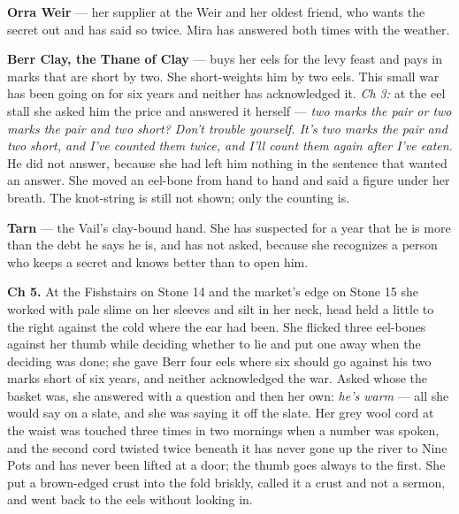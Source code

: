 \documentclass{design/chronicle}
\begin{document}
{\textbf{Orra Weir} — her supplier at the Weir and her oldest friend, who wants the secret out and has said so twice. Mira has answered both times with the weather.

\textbf{Berr Clay, the Thane of Clay} — buys her eels for the levy feast and pays in marks that are short by two. She short-weights him by two eels. This small war has been going on for six years and neither has acknowledged it. \emph{Ch 3:} at the eel stall she asked him the price and answered it herself --- \emph{two marks the pair or two marks the pair and two short? Don’t trouble yourself. It’s two marks the pair and two short, and I’ve counted them twice, and I’ll count them again after I’ve eaten.} He did not answer, because she had left him nothing in the sentence that wanted an answer. She moved an eel-bone from hand to hand and said a figure under her breath. The knot-string is still not shown; only the counting is.

\textbf{Tarn} — the Vail’s clay-bound hand. She has suspected for a year that he is more than the debt he says he is, and has not asked, because she recognizes a person who keeps a secret and knows better than to open him.

\textbf{Ch 5.} At the Fishstairs on Stone 14 and the market’s edge on Stone 15 she worked with pale slime on her sleeves and silt in her neck, head held a little to the right against the cold where the ear had been. She flicked three eel-bones against her thumb while deciding whether to lie and put one away when the deciding was done; she gave Berr four eels where six should go against his two marks short of six years, and neither acknowledged the war. Asked whose the basket was, she answered with a question and then her own: \emph{he’s warm} --- all she would say on a slate, and she was saying it off the slate. Her grey wool cord at the waist was touched three times in two mornings when a number was spoken, and the second cord twisted twice beneath it has never gone up the river to Nine Pots and has never been lifted at a door; the thumb goes always to the first. She put a brown-edged crust into the fold briskly, called it a crust and not a sermon, and went back to the eels without looking in.

}
\end{document}

